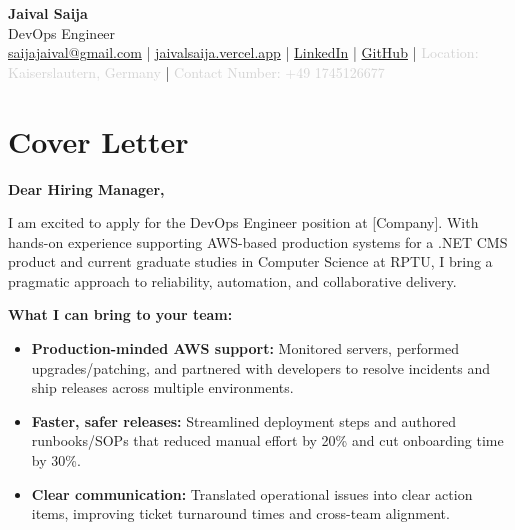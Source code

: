 \documentclass[11pt,a4paper]{article}
\newcommand{\dotnet}{\mbox{.NET}}
\begin{document}
\frenchspacing
{}
\setlength{\emergencystretch}{6em}
\sloppy

\begin{center}
\begin{minipage}{0.92\textwidth}
\centering
    {\Huge\bfseries Jaival Saija}\\[0.5pt]
    {\large DevOps Engineer}\\[2pt]
    {\small
    \href{mailto:saijajaival@gmail.com}{saijajaival@gmail.com} \quad | \quad
    \href{https://jaivalsaija.vercel.app}{jaivalsaija.vercel.app} \quad | \quad
    \href{https://linkedin.com/in/jaivalsaija}{LinkedIn} \quad | \quad
    \href{https://github.com/Jaival}{GitHub} \quad | \quad
    \textcolor{lightgray}{Location: Kaiserslautern, Germany} \quad | \quad
    \textcolor{lightgray}{Contact Number: +49 1745126677}
    }
\end{minipage}
\end{center}

\vspace{4pt}

\section*{Cover Letter}

\textbf{Dear Hiring Manager,}

I am excited to apply for the DevOps Engineer position at [Company]. With hands-on experience supporting AWS-based production systems for a {\dotnet} CMS product and current graduate studies in Computer Science at RPTU, I bring a pragmatic approach to reliability, automation, and collaborative delivery.

\textbf{What I can bring to your team:}
\begin{itemize}[leftmargin=*, topsep=0pt, itemsep=0pt, parsep=0pt, partopsep=0pt]
    \item \textbf{Production-minded AWS support:} Monitored servers, performed upgrades/patching, and partnered with developers to resolve incidents and ship releases across multiple environments.
    \item \textbf{Faster, safer releases:} Streamlined deployment steps and authored runbooks/SOPs that reduced manual effort by 20\% and cut onboarding time by 30\%.
    \item \textbf{Clear communication:} Translated operational issues into clear action items, improving ticket turnaround times and cross-team alignment.
\end{itemize}
\end{document}
